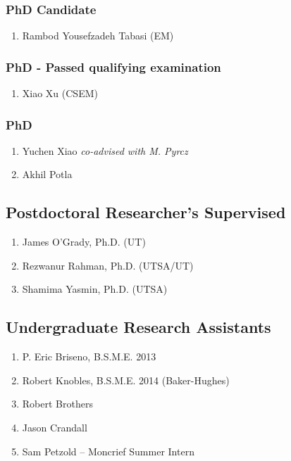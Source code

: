 \subsubsection*{PhD Candidate}
\begin{enumerate}
    \item Rambod Yousefzadeh Tabasi (EM)
\end{enumerate}

\subsubsection*{PhD - Passed qualifying examination}
\begin{enumerate}
    \item Xiao Xu (CSEM)
\end{enumerate}

\subsubsection*{PhD}
\begin{enumerate}
    \item Yuchen Xiao \emph{co-advised with M. Pyrcz}
    \item Akhil Potla 
\end{enumerate}


\subsection*{Postdoctoral Researcher's Supervised}
  \begin{enumerate}
      \item James O'Grady, Ph.D. (UT)
      \item Rezwanur Rahman, Ph.D. (UTSA/UT)
      \item Shamima Yasmin, Ph.D. (UTSA)
  \end{enumerate}

\subsection*{Undergraduate Research Assistants}
  \begin{enumerate}
    \item P. Eric Briseno, B.S.M.E. 2013
    \item Robert Knobles, B.S.M.E. 2014 (Baker-Hughes)
    \item Robert Brothers
    \item Jason Crandall
    \item Sam Petzold -- Moncrief Summer Intern
  \end{enumerate}

